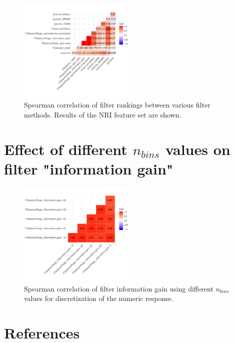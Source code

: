\documentclass[letterpaper, journal]{IEEEtran}
\begin{document}
\begin{figure} [h]
\begin{center}
\includegraphics[width=0.5\textwidth] {correlation-filter-nri-1.pdf}
\caption{Spearman correlation of filter rankings between various filter methods. Results of the NRI feature set are shown.}
\label{fig:correlation-filters}
\end{center}
\end{figure}

\section{Effect of different \texttt{$n_{bins}$} values on filter "information gain"}

\begin{figure} [h]
\begin{center}
\includegraphics[width=0.5\textwidth] {correlation-nbins-1.pdf}
\caption{Spearman correlation of filter information gain using different \texttt{$n_{bins}$} values for discretization of the numeric response.}
\label{fig:correlation-nbins}
\end{center}
\end{figure}




\section*{References}
\end{document}

